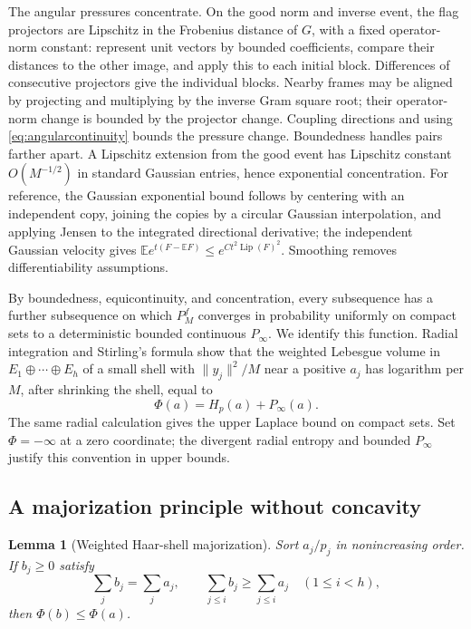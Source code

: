 \documentclass[11pt]{article}
\numberwithin{equation}{section}
\newtheorem{lemma}[theorem]{Lemma}
\theoremstyle{definition}
\newcommand{\E}{\mathbb E}
\newcommand{\Lip}{\operatorname{Lip}}
\newcommand{\norm}[1]{\lVert #1\rVert}
\begin{document}
The angular pressures concentrate. On the good norm and inverse event, the flag projectors are Lipschitz in the Frobenius distance of $G$, with a fixed operator-norm constant: represent unit vectors by bounded coefficients, compare their distances to the other image, and apply this to each initial block. Differences of consecutive projectors give the individual blocks. Nearby frames may be aligned by projecting and multiplying by the inverse Gram square root; their operator-norm change is bounded by the projector change. Coupling directions and using \eqref{eq:angularcontinuity} bounds the pressure change. Boundedness handles pairs farther apart. A Lipschitz extension from the good event has Lipschitz constant $O(M^{-1/2})$ in standard Gaussian entries, hence exponential concentration. For reference, the Gaussian exponential bound follows by centering with an independent copy, joining the copies by a circular Gaussian interpolation, and applying Jensen to the integrated directional derivative; the independent Gaussian velocity gives $\E e^{t(F-\E F)}\le e^{Ct^2\Lip(F)^2}$. Smoothing removes differentiability assumptions.

By boundedness, equicontinuity, and concentration, every subsequence has a further subsequence on which $P_M^f$ converges in probability uniformly on compact sets to a deterministic bounded continuous $P_\infty$. We identify this function. Radial integration and Stirling's formula show that the weighted Lebesgue volume in $E_1\oplus\cdots\oplus E_h$ of a small shell with $\norm{y_j}^2/M$ near a positive $a_j$ has logarithm per $M$, after shrinking the shell, equal to
\begin{equation}\label{eq:Phi}
\Phi(a)=H_p(a)+P_\infty(a).
\end{equation}
The same radial calculation gives the upper Laplace bound on compact sets. Set $\Phi=-\infty$ at a zero coordinate; the divergent radial entropy and bounded $P_\infty$ justify this convention in upper bounds.

\subsection{A majorization principle without concavity}
\begin{lemma}[Weighted Haar-shell majorization]\label{lem:majorization}
Sort $a_j/p_j$ in nonincreasing order. If $b_j\ge0$ satisfy
\begin{equation}\label{eq:prefix}
\sum_jb_j=\sum_ja_j,\qquad
\sum_{j\le i}b_j\ge\sum_{j\le i}a_j\quad(1\le i<h),
\end{equation}
then $\Phi(b)\le\Phi(a)$.
\end{lemma}
\end{document}
